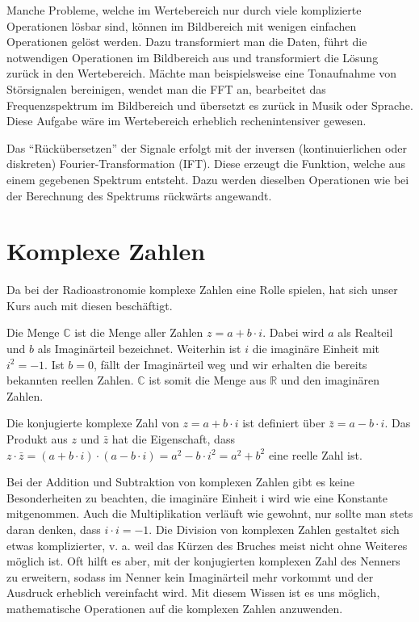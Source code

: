 \documentclass[]{dsadokumentation}
\begin{document}
Manche Probleme, welche im Wertebereich nur durch viele komplizierte Operationen l\"osbar sind, k\"onnen im Bildbereich mit wenigen einfachen Operationen gel\"ost werden. Dazu transformiert man die Daten, führt die notwendigen Operationen im Bildbereich aus und transformiert die Lösung zurück in den Wertebereich. Mächte man beispielsweise eine Tonaufnahme von Störsignalen bereinigen, wendet man die FFT an, bearbeitet das Frequenzspektrum im Bildbereich und übersetzt es zurück in Musik oder Sprache. Diese Aufgabe w\"are im Wertebereich erheblich rechenintensiver gewesen.

Das \enquote{Rückübersetzen} der Signale erfolgt mit der inversen (kontinuierlichen oder diskreten) Fourier-Transformation (IFT). Diese erzeugt die Funktion, welche aus einem gegebenen Spektrum entsteht. Dazu werden dieselben Operationen wie bei der Berechnung des Spektrums rückwärts angewandt.

\section{Komplexe Zahlen}

Da bei der Radioastronomie komplexe Zahlen eine Rolle spielen, hat sich unser Kurs auch mit diesen beschäftigt.

Die Menge $\mathbb{C}$ ist die Menge aller Zahlen $z=a+b\cdot i$. Dabei wird $a$ als Realteil und $b$ als Imaginärteil bezeichnet. Weiterhin ist $i$ die imagin\"are Einheit mit $i^{2} = -1$. Ist $b = 0$, fällt der Imaginärteil weg und wir erhalten die bereits bekannten reellen Zahlen. $\mathbb{C}$ ist somit die Menge aus $\mathbb{R}$ und den imaginären Zahlen.

Die konjugierte komplexe Zahl von $z=a+b\cdot i$ ist definiert über $\bar{z}=a-b\cdot i$. Das Produkt aus $z$ und $\bar{z}$ hat die Eigenschaft, dass $z\cdot \bar{z}=(a+b\cdot i)\cdot (a-b\cdot i)=a^2-b\cdot i^2=a^2+b^2$ eine reelle Zahl ist.

Bei der Addition und Subtraktion von komplexen Zahlen gibt es keine Besonderheiten zu beachten, die imaginäre Einheit i wird wie eine Konstante mitgenommen. Auch die Multiplikation verläuft wie gewohnt, nur sollte man stets daran denken, dass $i\cdot i=-1$.
Die Division von komplexen Zahlen gestaltet sich etwas komplizierter, v. a. weil das Kürzen des Bruches meist nicht ohne Weiteres möglich ist. Oft hilft es aber, mit der konjugierten komplexen Zahl des Nenners zu erweitern, sodass im Nenner kein Imaginärteil mehr vorkommt und der Ausdruck erheblich vereinfacht wird. Mit diesem Wissen ist es uns möglich, mathematische Operationen auf die komplexen Zahlen anzuwenden.
\end{document}
